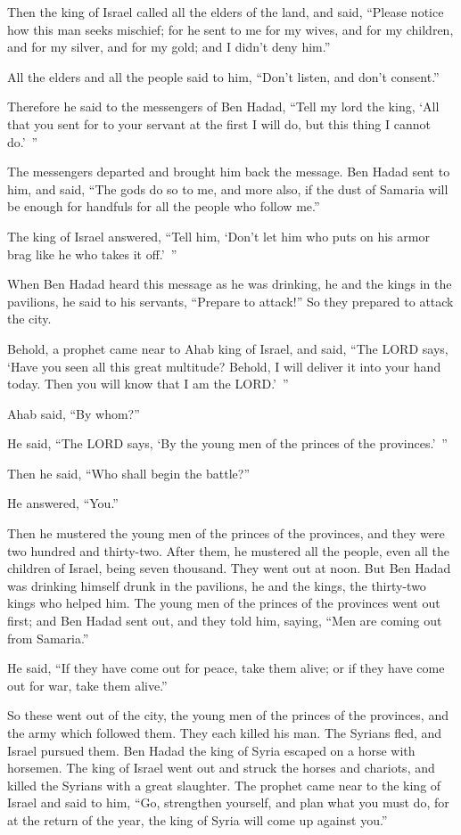 \myverse{}Then the king of Israel called all the elders of the land, and
said, “Please notice how this man seeks mischief; for he sent to me for my wives, and for my children,
and for my silver, and for my gold; and I didn’t deny him.”

\myverse{}All the elders and all the people said to him, “Don’t listen,
and don’t consent.”

\myverse{}Therefore he said to the messengers of Ben Hadad, “Tell my lord
the king, ‘All that you sent for to your servant at the first I will do, but this thing I cannot do.’ ”

The messengers departed and brought him back the message.
\myverse{}Ben Hadad sent to him, and said, “The gods do so to me, and more also, if
the dust of Samaria will be enough for handfuls for all the people who follow me.”

\myverse{}The king of Israel answered, “Tell him, ‘Don’t let him who puts
on his armor brag like he who takes it off.’ ”

\myverse{}When Ben Hadad heard this message as he was drinking, he and
the kings in the pavilions, he said to his servants, “Prepare to attack!” So they prepared to attack the
city.

\myverse{}Behold, a prophet came near to Ahab king of Israel, and said,
“The LORD says, ‘Have you seen all this great multitude? Behold, I will deliver it into your hand today.
Then you will know that I am the LORD.’ ”

\myverse{}Ahab said, “By whom?”

He said, “The LORD says, ‘By the young men of the princes of the provinces.’ ”

Then he said, “Who shall begin the battle?”

He answered, “You.”

\myverse{}Then he mustered the young men of the princes of the provinces,
and they were two hundred and thirty-two. After them, he mustered all the people, even all the children
of Israel, being seven thousand.
\myverse{}They went out at noon. But Ben Hadad was drinking himself drunk in the pavilions,
he and the kings, the thirty-two kings who helped him.
\myverse{}The young men of the princes of the provinces went out first; and Ben Hadad
sent out, and they told him, saying, “Men are coming out from Samaria.”

\myverse{}He said, “If they have come out for peace, take them alive;
or if they have come out for war, take them alive.”

\myverse{}So these went out of the city, the young men of the princes
of the provinces, and the army which followed them.
\myverse{}They each killed his man. The Syrians fled, and Israel pursued them. Ben
Hadad the king of Syria escaped on a horse with horsemen.
\myverse{}The king of Israel went out and struck the horses and chariots, and killed
the Syrians with a great slaughter.
\myverse{}The prophet came near to the king of Israel and said to him, “Go, strengthen
yourself, and plan what you must do, for at the return of the year, the king of Syria will come up against
you.”

